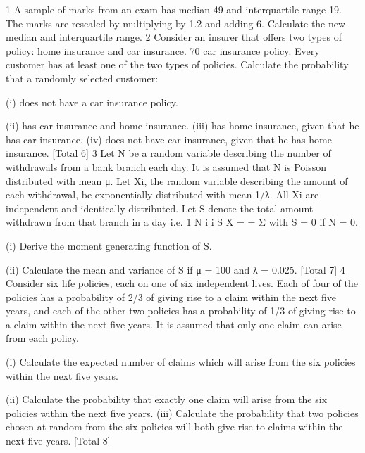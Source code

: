 1 A sample of marks from an exam has median 49 and interquartile range 19. The
marks are rescaled by multiplying by 1.2 and adding 6.
Calculate the new median and interquartile range. 
2 Consider an insurer that offers two types of policy: home insurance and car insurance.
70%
car insurance policy. Every customer has at least one of the two types of policies.
Calculate the probability that a randomly selected customer:
  \item (i) does not have a car insurance policy. 
\item (ii) has car insurance and home insurance. 
(iii) has home insurance, given that he has car insurance. 
(iv) does not have car insurance, given that he has home insurance. 
[Total 6]
3 Let N be a random variable describing the number of withdrawals from a bank branch
each day. It is assumed that N is Poisson distributed with mean μ. Let Xi, the random
variable describing the amount of each withdrawal, be exponentially distributed with
mean 1/λ. All Xi are independent and identically distributed. Let S denote the total
amount withdrawn from that branch in a day i.e.
1
N
i
i
S X
=
  = Σ
with S = 0 if N = 0.
\item (i) Derive the moment generating function of S. 
\item (ii) Calculate the mean and variance of S if μ = 100 and λ = 0.025. 
[Total 7]
4 Consider six life policies, each on one of six independent lives. Each of four of the
policies has a probability of 2/3 of giving rise to a claim within the next five years,
and each of the other two policies has a probability of 1/3 of giving rise to a claim
within the next five years. It is assumed that only one claim can arise from each
policy.
\item (i) Calculate the expected number of claims which will arise from the six policies
within the next five years. 
\item (ii) Calculate the probability that exactly one claim will arise from the six policies
within the next five years. 
(iii) Calculate the probability that two policies chosen at random from the six
policies will both give rise to claims within the next five years. 
[Total 8]

